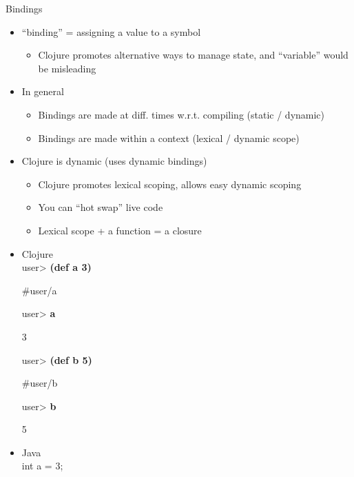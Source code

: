 \documentclass{beamer}
\begin{document}
\begin{frame}[allowframebreaks]{Bindings}
  \begin{itemize}
  \item ``binding'' = assigning a value to a symbol
    \begin{itemize}
    \item Clojure promotes alternative ways to manage state, and ``variable'' would be misleading
    \end{itemize}
  \item In general
    \begin{itemize} 
    \item Bindings are made at diff. times w.r.t. compiling (static / dynamic)
    \item Bindings are made within a context (lexical / dynamic scope)
    \end{itemize}
  \item Clojure is dynamic (uses dynamic bindings)
    \begin{itemize}
    \item Clojure promotes lexical scoping, allows easy dynamic
      scoping
    \item You can ``hot swap'' live code
    \item Lexical scope + a function = a closure
    \end{itemize}
  \item Clojure\\
{\ttfamily\color{black}
%
\textcolor[rgb]{0.49803922,0.0,0.49803922}{user{\textgreater}
}\textbf{(def a 3)}}

{\ttfamily\color{black}
\#{\textquotesingle}user/a}

{\ttfamily\color{black}
\textcolor[rgb]{0.49803922,0.0,0.49803922}{user{\textgreater}
}\textbf{a}}

{\ttfamily\color{black}
3}

{\ttfamily\color{black}
\textcolor[rgb]{0.49803922,0.0,0.49803922}{user{\textgreater}
}\textbf{(def b 5)}}

{\ttfamily\color{black}
\#{\textquotesingle}user/b}

{\ttfamily\color{black}
\textcolor[rgb]{0.49803922,0.0,0.49803922}{user{\textgreater}
}\textbf{b}}

{\ttfamily\color{black}
5}
  \item Java\\
{\ttfamily\color{black}
%
\textcolor[rgb]{0.13333334,0.54509807,0.13333334}{int}
\textcolor[rgb]{0.627451,0.32156864,0.1764706}{a} = 3;}


\end{itemize}
\end{frame}
\end{document}
